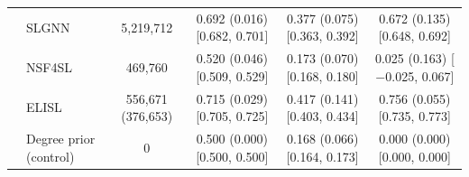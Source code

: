 \begin{tabular}{ll|cccc}
 & SLGNN & 5{,}219{,}712 & 0.692 (0.016) {\scriptsize [0.682, 0.701]} & 0.377 (0.075) {\scriptsize [0.363, 0.392]} & 0.672 (0.135) {\scriptsize [0.648, 0.692]} \\
 & NSF4SL & 469{,}760 & 0.520 (0.046) {\scriptsize [0.509, 0.529]} & 0.173 (0.070) {\scriptsize [0.168, 0.180]} & 0.025 (0.163) {\scriptsize [$-$0.025, 0.067]} \\
 & ELISL & 556{,}671 (376{,}653) & 0.715 (0.029) {\scriptsize [0.705, 0.725]} & 0.417 (0.141) {\scriptsize [0.403, 0.434]} & 0.756 (0.055) {\scriptsize [0.735, 0.773]} \\
 & Degree prior (control) & 0 & 0.500 (0.000) {\scriptsize [0.500, 0.500]} & 0.168 (0.066) {\scriptsize [0.164, 0.173]} & 0.000 (0.000) {\scriptsize [0.000, 0.000]} \\
\hline
\end{tabular}
